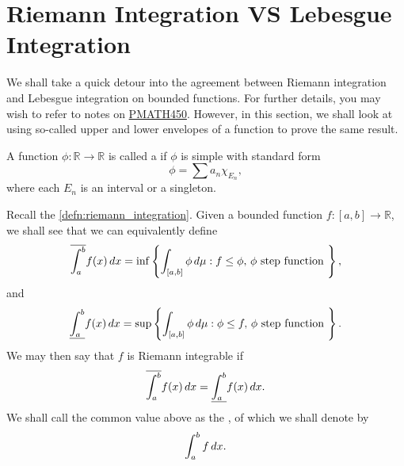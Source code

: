 \documentclass[notoc,notitlepage]{tufte-book}
\begin{document}
\section{Riemann Integration VS Lebesgue Integration}%
\label{sec:riemann_integration_vs_lebesgue_integration}

We shall take a quick detour into the agreement between
Riemann integration and Lebesgue integration on
bounded functions.
For further details, you may wish to refer to notes on
\href{https://tex.japorized.ink/PMATH450/classnotes.pdf}{PMATH450}.
However, in this section, we shall look at using
so-called upper and lower envelopes of a function
to prove the same result.

\begin{defn}\label{defn:step_functions}
  A function $\phi : \mathbb{R} \to \mathbb{R}$
  is called a  if $\phi$ is simple with standard form
  \begin{equation*}
    \phi = \sum a_n \chi_{E_n},
  \end{equation*}
  where each $E_n$ is an interval or a singleton.
\end{defn}

Recall the \cref{defn:riemann_integration}.
Given a bounded function $f : [a, b] \to \mathbb{R}$,
we shall see that we can equivalently define
\begin{equation*}
  \overline{\int_a^b} f(x) \mathop{}\!d{x} = \inf \left\{ 
    \int_{[a, b]} \phi \mathop{}\!d{\mu}: f \leq \phi,\, \phi \text{ step function }
  \right\},
\end{equation*}
and
\begin{equation*}
  \underline{\int_a^b} f(x) \mathop{}\!d{x} = \sup \left\{ 
    \int_{[a, b]} \phi \mathop{}\!d{\mu} : \phi \leq f,\, \phi \text{ step function }
  \right\}.
\end{equation*}
We may then say that $f$ is Riemann integrable if
\begin{equation*}
  \overline{\int_{a}^{b}} f(x) \mathop{}\!d{x} = \underline{\int_{a}^{b}} f(x) \mathop{}\!d{x}.
\end{equation*}
We shall call the common value above as the ,
of which we shall denote by
\begin{equation*}
  \int_{a}^{b} f \mathop{}\!d{x}.
\end{equation*}
\end{document}
